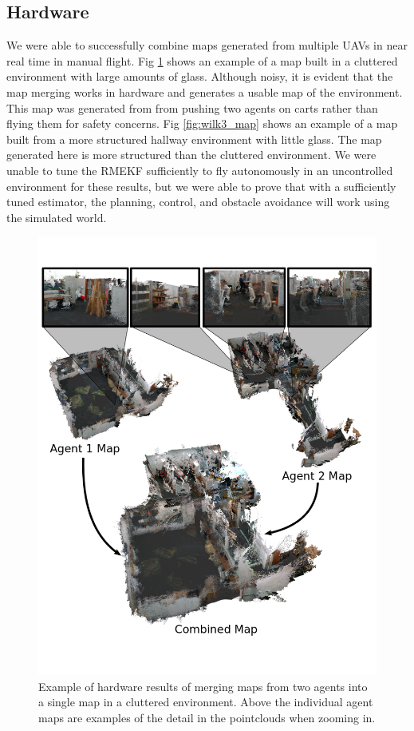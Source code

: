 \documentclass[letterpaper, 10 pt, conference]{ieeeconf}  %
\begin{document}
\subsection{Hardware}

We were able to successfully combine maps generated from multiple UAVs in near real time in manual flight. Fig \ref{fig:lab_map} shows an example of a map built in a cluttered environment with large amounts of glass. Although noisy, it is evident that the map merging works in hardware and generates a usable map of the environment. This map was generated from from pushing two agents on carts rather than flying them for safety concerns. Fig \ref{fig:wilk3_map} shows an example of a map built from a more structured hallway environment with little glass. The map generated here is more structured than the cluttered environment. We were unable to tune the RMEKF sufficiently to fly autonomously in an uncontrolled environment for these results, but we were able to prove that with a sufficiently tuned estimator, the planning, control, and obstacle avoidance will work using the simulated world.

\begin{figure}
\centering
\includegraphics[width=0.9\linewidth]{lab_map.png}
\caption{Example of hardware results of merging maps from two agents into a single map in a cluttered environment. Above the individual agent maps are examples of the detail in the pointclouds when zooming in.}
\label{fig:lab_map}
\end{figure}
\end{document}

